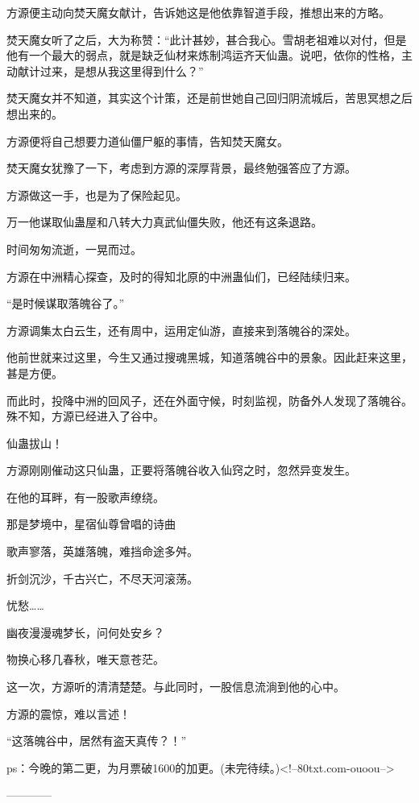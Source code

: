 \begin{this_body}
方源便主动向焚天魔女献计，告诉她这是他依靠智道手段，推想出来的方略。

焚天魔女听了之后，大为称赞：“此计甚妙，甚合我心。雪胡老祖难以对付，但是他有一个最大的弱点，就是缺乏仙材来炼制鸿运齐天仙蛊。说吧，依你的性格，主动献计过来，是想从我这里得到什么？”

焚天魔女并不知道，其实这个计策，还是前世她自己回归阴流城后，苦思冥想之后想出来的。

方源便将自己想要力道仙僵尸躯的事情，告知焚天魔女。

焚天魔女犹豫了一下，考虑到方源的深厚背景，最终勉强答应了方源。

方源做这一手，也是为了保险起见。

万一他谋取仙蛊屋和八转大力真武仙僵失败，他还有这条退路。

时间匆匆流逝，一晃而过。

方源在中洲精心探查，及时的得知北原的中洲蛊仙们，已经陆续归来。

“是时候谋取落魄谷了。”

方源调集太白云生，还有周中，运用定仙游，直接来到落魄谷的深处。

他前世就来过这里，今生又通过搜魂黑城，知道落魄谷中的景象。因此赶来这里，甚是方便。

而此时，投降中洲的回风子，还在外面守候，时刻监视，防备外人发现了落魄谷。殊不知，方源已经进入了谷中。

仙蛊拔山！

方源刚刚催动这只仙蛊，正要将落魄谷收入仙窍之时，忽然异变发生。

在他的耳畔，有一股歌声缭绕。

那是梦境中，星宿仙尊曾唱的诗曲

歌声寥落，英雄落魄，难挡命途多舛。

折剑沉沙，千古兴亡，不尽天河滚荡。

忧愁……

幽夜漫漫魂梦长，问何处安乡？

物换心移几春秋，唯天意苍茫。

这一次，方源听的清清楚楚。与此同时，一股信息流淌到他的心中。

方源的震惊，难以言述！

“这落魄谷中，居然有盗天真传？！”

ps：今晚的第二更，为月票破1600的加更。(未完待续。)<!--80txt.com-ouoou-->

------------

\end{this_body}

